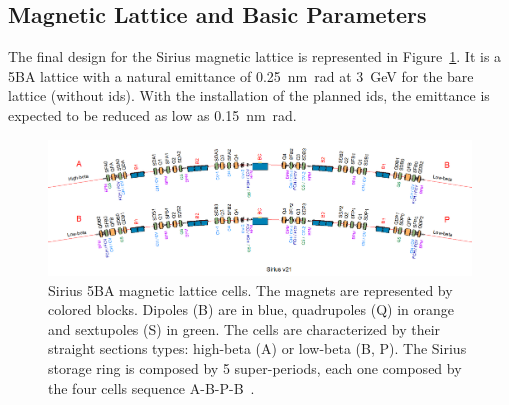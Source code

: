 \subsection{Magnetic Lattice and Basic Parameters}
The final design for the Sirius magnetic lattice is represented in Figure~\ref{fig:sirius_lattice}. It is a 5BA lattice with a natural emittance of \SI{0.25}{\nano\meter\radian} at \SI{3}{\giga\electronvolt} for the bare lattice (without \glspl{id}). With the installation of the planned \glspl{id}, the emittance is expected to be reduced as low as \SI{0.15}{\nano\meter\radian}.
\begin{figure}
    \centering
    \includegraphics[width=\textwidth, trim={0 2cm 0 0}, clip]{figures/sirius_lattice.png}
    \caption{Sirius 5BA magnetic lattice cells. The magnets are represented by colored blocks. Dipoles (B) are in blue, quadrupoles (Q) in orange and sextupoles (S) in green. The cells are characterized by their straight sections types: high-beta (A) or low-beta (B, P). The Sirius storage ring is composed by 5 super-periods, each one composed by the four cells sequence A-B-P-B~\cite{wiki}.}
    \label{fig:sirius_lattice}
\end{figure}

